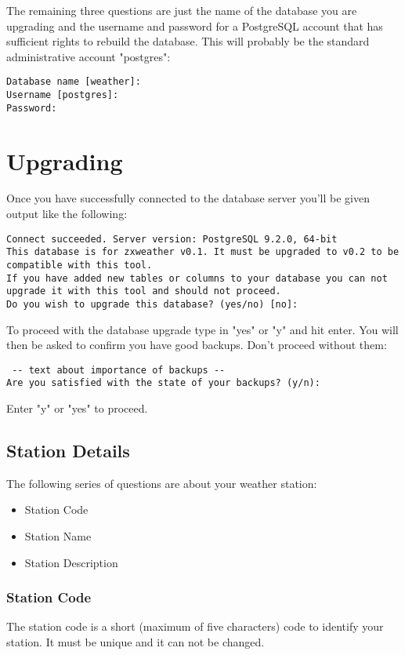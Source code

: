 \documentclass[a4paper,10pt,draft]{book}
\begin{document}
The remaining three questions are just the name of the database you are upgrading and the username and password for a PostgreSQL account that has sufficient rights to rebuild the database. This will probably be the standard administrative account "postgres":
\begin{verbatim}
Database name [weather]: 
Username [postgres]:
Password: 
\end{verbatim}

\section{Upgrading}
Once you have successfully connected to the database server you'll be given output like the following:
\begin{verbatim}
Connect succeeded. Server version: PostgreSQL 9.2.0, 64-bit
This database is for zxweather v0.1. It must be upgraded to v0.2 to be
compatible with this tool.
If you have added new tables or columns to your database you can not 
upgrade it with this tool and should not proceed.
Do you wish to upgrade this database? (yes/no) [no]:
\end{verbatim}

To proceed with the database upgrade type in "yes" or "y" and hit enter. You will then be asked to confirm you have good backups. Don't proceed without them:
\begin{verbatim}
 -- text about importance of backups --
Are you satisfied with the state of your backups? (y/n):
\end{verbatim}

Enter "y" or "yes" to proceed.

\subsection{Station Details}
The following series of questions are about your weather station:
\begin{itemize}
\item Station Code
\item Station Name
\item Station Description
\end{itemize}

\subsubsection{Station Code}
The station code is a short (maximum of five characters) code to identify your station. It must be unique and it can not be changed.
\end{document}
